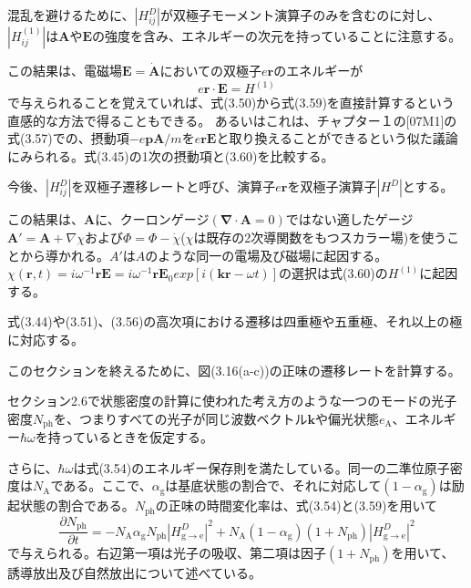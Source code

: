 \documentclass[11pt,a4j,uplatex]{jsarticle}
\begin{document}
混乱を避けるために、$\left|H_{ij}^D\right|$が双極子モーメント演算子のみを含むのに対し、$\left|H_{ij}^{(1)}\right|$は$\bm{A}$や$\bm{E}$の強度を含み、エネルギーの次元を持っていることに注意する。

この結果は、電磁場$\bm{E}=\dot{\bm{A}}$においての双極子$e\bm{r}$のエネルギーが
\begin{equation}
  e\bm{r}\cdot\bm{E}=H^{(1)}\tag{3.60}
\end{equation}
で与えられることを覚えていれば、式(3.50)から式(3.59)を直接計算するという直感的な方法で得ることもできる。
あるいはこれは、チャプター１の[07M1]の式(3.57)での、摂動項$-e\bm{pA}/m$を$e\bm{rE}$と取り換えることができるという似た議論にみられる。式(3.45)の1次の摂動項と(3.60)を比較する。%

今後、$\left|H_{ij}^D\right|$を双極子遷移レートと呼び、演算子$e\bm{r}$を双極子演算子$\left|H^D\right|$とする。

この結果は、$\bm{A}$に、クーロンゲージ$(\bm{\nabla\cdot A}=0)$ではない適したゲージ$\bm{A}'=\bm{A}+\nabla\chi$および$\Phi=\Phi-\dot\chi$($\chi$は既存の2次導関数をもつスカラー場)を使うことから導かれる。$A'$は$A$のような同一の電場及び磁場に起因する。$\chi(\bm{r},t)=i\omega^{-1}\bm{rE}=i\omega^{-1}\bm{r}\bm{E}_0exp[i(\bm{kr}-\omega t)]$の選択は式(3.60)の$H^{(1)}$に起因する。

式(3.44)や(3.51)、(3.56)の高次項における遷移は四重極や五重極、それ以上の極に対応する。

このセクションを終えるために、図(3.16(a-c))の正味の遷移レートを計算する。

セクション2.6で状態密度の計算に使われた考え方のような一つのモードの光子密度$N_{\mathrm{ph}}$を、つまりすべての光子が同じ波数ベクトル$\bm{k}$や偏光状態$e_{\mathrm{A}}$、エネルギー$\hbar\omega$を持っているときを仮定する。

さらに、$\hbar\omega$は式(3.54)のエネルギー保存則を満たしている。同一の二準位原子密度は$N_{\mathrm{A}}$である。ここで、$\alpha_{\mathrm{g}}$は基底状態の割合で、それに対応して$(1-\alpha_{\mathrm{g}})$は励起状態の割合である。$N_{\mathrm{ph}}$の正味の時間変化率は、式(3.54)と(3.59)を用いて
\begin{equation}
  \frac{\partial N_{\mathrm{ph}}}{\partial t}=-N_{\mathrm{A}}\alpha_{\mathrm{g}}N_{\mathrm{ph}}\left|H_{\mathrm{g\to e}}^D\right|^2+N_{\mathrm{A}}(1-\alpha_{\mathrm{g}})(1+N_{\mathrm{ph}})\left|H_{\mathrm{g\to e}}^D\right|^2\tag{3.61}
\end{equation}
で与えられる。右辺第一項は光子の吸収、第二項は因子$(1+N_{\mathrm{ph}})$を用いて、誘導放出及び自然放出について述べている。
\end{document}

